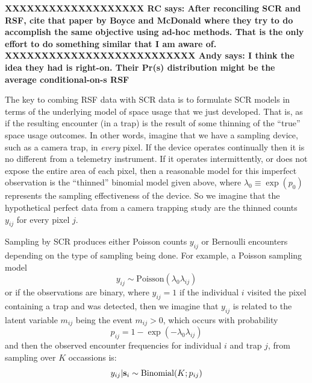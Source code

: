 {\bf XXXXXXXXXXXXXXXXXXX
RC says: After reconciling SCR and RSF, cite that paper
by Boyce and McDonald where they try to do accomplish the same
objective using ad-hoc methods. That is the only effort to do
something similar that I am aware of.
XXXXXXXXXXXXXXXXXXXXXXXXXX
Andy says: I think the idea they had is right-on. Their Pr(s)
distribution
might be the average conditional-on-s RSF
}

The key to combing RSF data with SCR data is to formulate SCR models
in terms of the underlying model of space usage that we just
developed. That is, as if the resulting encounter (in a trap) is the
result of some thinning of the ``true'' space usage outcomes.
In other words, imagine that we have a sampling
device, such as a camera trap, in {\it every} pixel. If the device
operates continually then it is no different from a telemetry
instrument.  If it operates intermittently, or does not expose the
entire area of each pixel, then a reasonable model for this imperfect
observation is the ``thinned'' binomial model given above, where
$\lambda_{0} \equiv \exp(p_{0})$ represents the sampling
effectiveness of the device. So we imagine that the hypothetical
perfect data from a camera trapping study are the thinned counts
$y_{ij}$ for every pixel $j$.

Sampling by SCR produces either Poisson counts $y_{ij}$ or Bernoulli
encounters depending on the type of sampling being done. For example,
a Poisson sampling model
\[
y_{ij} \sim \mbox{Poisson}(\lambda_{0} \lambda_{ij})
\]
or if the observations are binary,
where $y_{ij} = 1$ if the individual $i$ visited
the pixel containing a trap and was detected, then we imagine that
$y_{ij}$ is related to the latent variable $m_{ij}$ being the event
$m_{ij}>0$, which occurs with probability
\[
 p_{ij} = 1-\exp(- \lambda_{0} \lambda_{ij})
\]
and then the observed encounter frequencies for individual $i$ and trap $j$, from
sampling over $K$ occassions is:
\[
 y_{ij}|{\bf s}_{i} \sim \mbox{Binomial}(K; p_{ij})
\]

